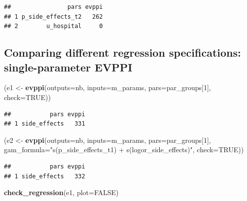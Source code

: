 \documentclass[
]{article}
\newenvironment{Shaded}{\begin{snugshade}}{\end{snugshade}}
\newcommand{\AttributeTok}[1]{\textcolor[rgb]{0.13,0.29,0.53}{#1}}
\newcommand{\ConstantTok}[1]{\textcolor[rgb]{0.56,0.35,0.01}{#1}}
\newcommand{\DecValTok}[1]{\textcolor[rgb]{0.00,0.00,0.81}{#1}}
\newcommand{\FunctionTok}[1]{\textcolor[rgb]{0.13,0.29,0.53}{\textbf{#1}}}
\newcommand{\NormalTok}[1]{#1}
\newcommand{\OtherTok}[1]{\textcolor[rgb]{0.56,0.35,0.01}{#1}}
\newcommand{\StringTok}[1]{\textcolor[rgb]{0.31,0.60,0.02}{#1}}
\begin{document}
\begin{verbatim}
##                pars evppi
## 1 p_side_effects_t2   262
## 2        u_hospital     0
\end{verbatim}

\hypertarget{comparing-different-regression-specifications-single-parameter-evppi}{%
\subsection{Comparing different regression specifications:
single-parameter
EVPPI}\label{comparing-different-regression-specifications-single-parameter-evppi}}

\begin{Shaded}
\begin{Highlighting}[]
\NormalTok{(e1 }\OtherTok{\textless{}{-}} \FunctionTok{evppi}\NormalTok{(}\AttributeTok{outputs=}\NormalTok{nb, }\AttributeTok{inputs=}\NormalTok{m\_params, }\AttributeTok{pars=}\NormalTok{par\_groups[}\DecValTok{1}\NormalTok{], }\AttributeTok{check=}\ConstantTok{TRUE}\NormalTok{))}
\end{Highlighting}
\end{Shaded}

\begin{verbatim}
##           pars evppi
## 1 side_effects   331
\end{verbatim}

\begin{Shaded}
\begin{Highlighting}[]
\NormalTok{(e2 }\OtherTok{\textless{}{-}} \FunctionTok{evppi}\NormalTok{(}\AttributeTok{outputs=}\NormalTok{nb, }\AttributeTok{inputs=}\NormalTok{m\_params, }\AttributeTok{pars=}\NormalTok{par\_groups[}\DecValTok{1}\NormalTok{], }
             \AttributeTok{gam\_formula=}\StringTok{"s(p\_side\_effects\_t1) + s(logor\_side\_effects)"}\NormalTok{, }\AttributeTok{check=}\ConstantTok{TRUE}\NormalTok{))}
\end{Highlighting}
\end{Shaded}

\begin{verbatim}
##           pars evppi
## 1 side_effects   332
\end{verbatim}

\begin{Shaded}
\begin{Highlighting}[]
\FunctionTok{check\_regression}\NormalTok{(e1, }\AttributeTok{plot=}\ConstantTok{FALSE}\NormalTok{)}
\end{Highlighting}
\end{Shaded}
\end{document}
